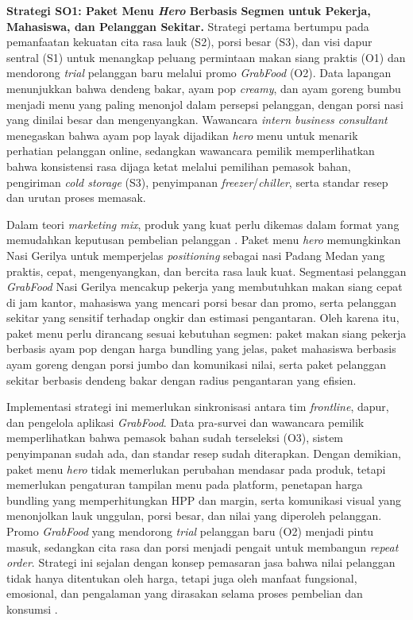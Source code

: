 \textbf{Strategi SO1: Paket Menu \textit{Hero} Berbasis Segmen untuk Pekerja, Mahasiswa, dan Pelanggan Sekitar.} Strategi pertama bertumpu pada pemanfaatan kekuatan cita rasa lauk (S2), porsi besar (S3), dan visi dapur sentral (S1) untuk menangkap peluang permintaan makan siang praktis (O1) dan mendorong \textit{trial} pelanggan baru melalui promo \textit{GrabFood} (O2). Data lapangan menunjukkan bahwa dendeng bakar, ayam pop \textit{creamy}, dan ayam goreng bumbu menjadi menu yang paling menonjol dalam persepsi pelanggan, dengan porsi nasi yang dinilai besar dan mengenyangkan. Wawancara \textit{intern business consultant} menegaskan bahwa ayam pop layak dijadikan \textit{hero} menu untuk menarik perhatian pelanggan online, sedangkan wawancara pemilik memperlihatkan bahwa konsistensi rasa dijaga ketat melalui pemilihan pemasok bahan, pengiriman \textit{cold storage} (S3), penyimpanan \textit{freezer}/\textit{chiller}, serta standar resep dan urutan proses memasak.

Dalam teori \textit{marketing mix}, produk yang kuat perlu dikemas dalam format yang memudahkan keputusan pembelian pelanggan \parencite{kotler2023principlesmarketing}. Paket menu \textit{hero} memungkinkan Nasi Gerilya untuk memperjelas \textit{positioning} sebagai nasi Padang Medan yang praktis, cepat, mengenyangkan, dan bercita rasa lauk kuat. Segmentasi pelanggan \textit{GrabFood} Nasi Gerilya mencakup pekerja yang membutuhkan makan siang cepat di jam kantor, mahasiswa yang mencari porsi besar dan promo, serta pelanggan sekitar yang sensitif terhadap ongkir dan estimasi pengantaran. Oleh karena itu, paket menu perlu dirancang sesuai kebutuhan segmen: paket makan siang pekerja berbasis ayam pop dengan harga bundling yang jelas, paket mahasiswa berbasis ayam goreng dengan porsi jumbo dan komunikasi nilai, serta paket pelanggan sekitar berbasis dendeng bakar dengan radius pengantaran yang efisien.

Implementasi strategi ini memerlukan sinkronisasi antara tim \textit{frontline}, dapur, dan pengelola aplikasi \textit{GrabFood}. Data pra-survei dan wawancara pemilik memperlihatkan bahwa pemasok bahan sudah terseleksi (O3), sistem penyimpanan sudah ada, dan standar resep sudah diterapkan. Dengan demikian, paket menu \textit{hero} tidak memerlukan perubahan mendasar pada produk, tetapi memerlukan pengaturan tampilan menu pada platform, penetapan harga bundling yang memperhitungkan HPP dan margin, serta komunikasi visual yang menonjolkan lauk unggulan, porsi besar, dan nilai yang diperoleh pelanggan. Promo \textit{GrabFood} yang mendorong \textit{trial} pelanggan baru (O2) menjadi pintu masuk, sedangkan cita rasa dan porsi menjadi pengait untuk membangun \textit{repeat order}. Strategi ini sejalan dengan konsep pemasaran jasa bahwa nilai pelanggan tidak hanya ditentukan oleh harga, tetapi juga oleh manfaat fungsional, emosional, dan pengalaman yang dirasakan selama proses pembelian dan konsumsi \parencite{wirtz2024servicesmarketing,kotler2021marketingmanagement}.

